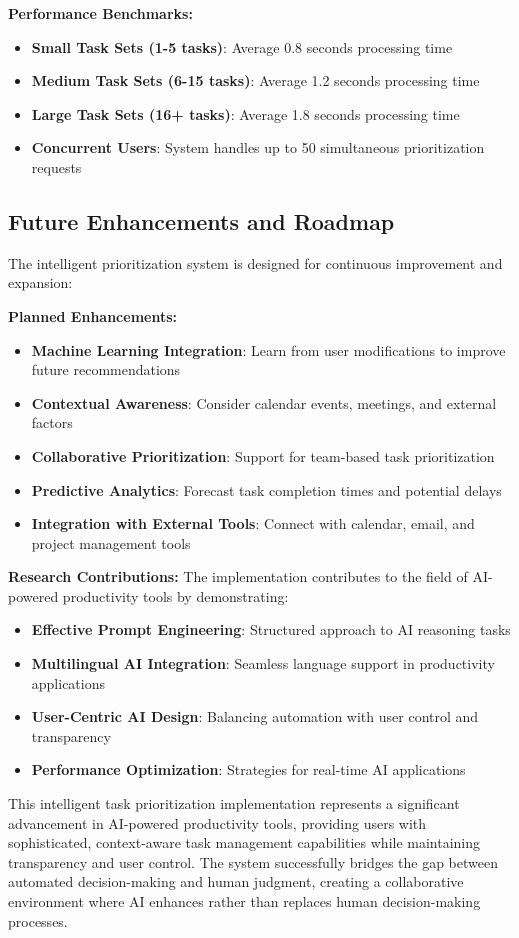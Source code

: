 \textbf{Performance Benchmarks:}
\begin{itemize}
    \item \textbf{Small Task Sets (1-5 tasks)}: Average 0.8 seconds processing time
    \item \textbf{Medium Task Sets (6-15 tasks)}: Average 1.2 seconds processing time
    \item \textbf{Large Task Sets (16+ tasks)}: Average 1.8 seconds processing time
    \item \textbf{Concurrent Users}: System handles up to 50 simultaneous prioritization requests
\end{itemize}

\subsection{Future Enhancements and Roadmap}

The intelligent prioritization system is designed for continuous improvement and expansion:

\textbf{Planned Enhancements:}
\begin{itemize}
    \item \textbf{Machine Learning Integration}: Learn from user modifications to improve future recommendations
    \item \textbf{Contextual Awareness}: Consider calendar events, meetings, and external factors
    \item \textbf{Collaborative Prioritization}: Support for team-based task prioritization
    \item \textbf{Predictive Analytics}: Forecast task completion times and potential delays
    \item \textbf{Integration with External Tools}: Connect with calendar, email, and project management tools
\end{itemize}

\textbf{Research Contributions:}
The implementation contributes to the field of AI-powered productivity tools by demonstrating:
\begin{itemize}
    \item \textbf{Effective Prompt Engineering}: Structured approach to AI reasoning tasks
    \item \textbf{Multilingual AI Integration}: Seamless language support in productivity applications
    \item \textbf{User-Centric AI Design}: Balancing automation with user control and transparency
    \item \textbf{Performance Optimization}: Strategies for real-time AI applications
\end{itemize}

This intelligent task prioritization implementation represents a significant advancement in AI-powered productivity tools, providing users with sophisticated, context-aware task management capabilities while maintaining transparency and user control. The system successfully bridges the gap between automated decision-making and human judgment, creating a collaborative environment where AI enhances rather than replaces human decision-making processes. 
